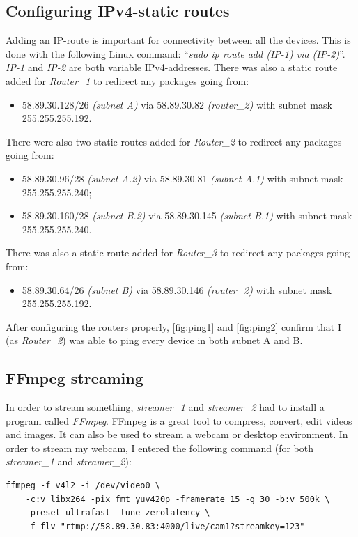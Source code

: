 \documentclass[a4paper,1pt]{article}
\begin{document}
\subsection{Configuring IPv4-static routes}
Adding an IP-route is important for connectivity between all the devices. 
This is done with the following Linux command: ``\textit{sudo ip route add (IP-1) via (IP-2)}''. 
\textit{IP-1} and \textit{IP-2} are both variable IPv4-addresses.  
There was also a static route added for \textit{Router\_1} to redirect any packages going from:
\begin{itemize}
  \item 58.89.30.128/26 \textit{(subnet A)} via 58.89.30.82 \textit{(router\_2)} with subnet mask 255.255.255.192.
\end{itemize} 
There were also two static routes added for \textit{Router\_2} to redirect any packages going from:
\begin{itemize}
  \item 58.89.30.96/28 \textit{(subnet A.2)} via 58.89.30.81 \textit{(subnet A.1)} with subnet mask 255.255.255.240;
  \item 58.89.30.160/28 \textit{(subnet B.2)} via 58.89.30.145 \textit{(subnet B.1)} with subnet mask 255.255.255.240.
\end{itemize} 
There was also a static route added for \textit{Router\_3} to redirect any packages going from:
\begin{itemize}
  \item 58.89.30.64/26 \textit{(subnet B)} via 58.89.30.146 \textit{(router\_2)} with subnet mask 255.255.255.192.
\end{itemize} 
After configuring the routers properly, \autoref{fig:ping1} and \autoref{fig:ping2} confirm that I (as \textit{Router\_2}) was able to ping every device in both subnet A and B.
\subsection{FFmpeg streaming}
In order to stream something, \textit{streamer\_1} and \textit{streamer\_2} had to install a program called \textit{FFmpeg}. 
FFmpeg is a great tool to compress, convert, edit videos and images. 
It can also be used to stream a webcam or desktop environment. 
In order to stream my webcam, I entered the following command (for both \textit{streamer\_1} and \textit{streamer\_2}):

\begin{Verbatim}[frame=single, tabsize=4]
  ffmpeg -f v4l2 -i /dev/video0 \
    -c:v libx264 -pix_fmt yuv420p -framerate 15 -g 30 -b:v 500k \
    -preset ultrafast -tune zerolatency \
    -f flv "rtmp://58.89.30.83:4000/live/cam1?streamkey=123"
  \end{Verbatim}
  
\end{document}
